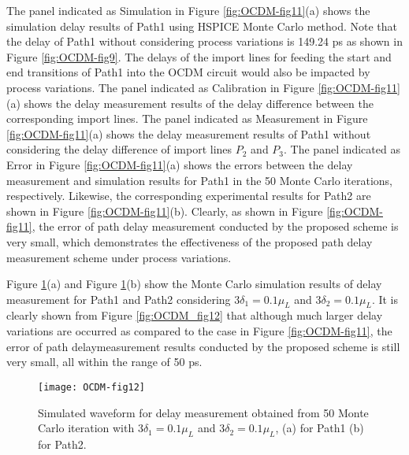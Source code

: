The panel indicated as Simulation in Figure \ref{fig:OCDM-fig11}(a) shows the simulation delay results of Path1 using HSPICE Monte Carlo method. Note that the delay of Path1 without considering process variations is 149.24 ps as shown in Figure \ref{fig:OCDM-fig9}. The delays of the import lines for feeding the start and end transitions of Path1 into the OCDM circuit would also be impacted by process variations. The panel indicated as Calibration in Figure \ref{fig:OCDM-fig11}(a) shows the delay measurement results of the delay difference between the corresponding import lines. The panel indicated as Measurement in Figure \ref{fig:OCDM-fig11}(a) shows the delay measurement results of Path1 without considering the delay difference of import lines $P_{2}$ and $P_{3}$. The panel indicated as Error in Figure \ref{fig:OCDM-fig11}(a) shows the errors between the delay measurement and simulation results for Path1 in the 50 Monte Carlo iterations, respectively. Likewise, the corresponding experimental results for Path2 are shown in Figure \ref{fig:OCDM-fig11}(b). Clearly, as shown in Figure \ref{fig:OCDM-fig11}, the error of path delay measurement conducted by the proposed scheme is very small, which demonstrates the effectiveness of the proposed path delay measurement scheme under process variations.


Figure \ref{fig:OCDM-fig12}(a) and Figure \ref{fig:OCDM-fig12}(b) show the Monte Carlo simulation results of delay measurement for Path1 and Path2 considering $3\delta_{1}=0.1\mu_{L}$ and $3\delta_{2}=0.1\mu_{L}$. It is clearly shown from Figure \ref{fig:OCDM_fig12} that although much larger delay variations are occurred as compared to the case in Figure \ref{fig:OCDM-fig11}, the error of path delaymeasurement results conducted by the proposed scheme is still very small, all within
the range of 50 ps.

\begin{figure}[t]
\centering
\texttt{[image: OCDM-fig12]}
    \caption{Simulated waveform for delay measurement obtained from 50 Monte Carlo iteration with $3\delta_{1}=0.1\mu_{L}$ and $3\delta_{2}=0.1\mu_{L}$, (a) for Path1 (b) for Path2.}
    \label{fig:OCDM-fig12}
\end{figure}


